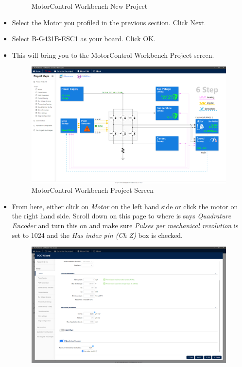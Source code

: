 \documentclass[10pt]{article}
\begin{document}
\begin{itemize}
\begin{figure}[H]
                        \caption{MotorControl Workbench New Project}
                    \end{figure}
                \item Select the Motor you profiled in the previous section. Click Next
                \item Select B-G431B-ESC1 as your board. Click OK.
                \item This will bring you to the MotorControl Workbench Project screen.
                    \begin{figure}[H]
                        \centerline{\includegraphics[width=\textwidth]{References/MCW Project Screen.png}}
                        \caption{MotorControl Workbench Project Screen}
                    \end{figure}
                \item From here, either click on \emph{Motor} on the left hand side or click the motor on the right hand side. Scroll down on this page to where is says \emph{Quadrature Encoder} and turn this on and make sure \emph{Pulses per mechanical revolution} is set to 1024 and the \emph{Has index pin (Ch Z)} box is checked.
                    \begin{figure}[H]
                        \centerline{\includegraphics[width=\textwidth]{References/MCW FOC Quadrature Encoder.png}}

\end{figure}
\end{itemize}
\end{document}
